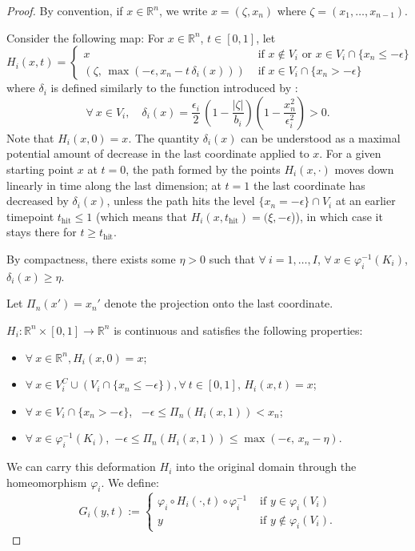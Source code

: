 \documentclass[11pt]{article}
\newcommand{\R}{\mathbb{R}}
\newcommand{\eps}{\epsilon}
\newcommand{\inter}{\cap}
\newcommand{\union}{\cup}
\theoremstyle{plain}
\theoremstyle{definition}
\theoremstyle{remark}
\begin{document}
\begin{proof}
	
	By convention, if $x \in \R^n$, we write $x = (\zeta, x_n)$ where $\zeta = (x_1,\ldots,x_{n-1})$.
	
	Consider the following map: For $x \in \R^n$, $t \in [0,1]$, let
	\[ H_i(x,t) =
	\begin{cases}
		x & \text{ if } x \notin V_i \text{ or } x \in V_i \inter \{x_n \leq - \eps\} \\
		(\zeta,\, \max(-\eps, x_n - t \, \delta_i(x) )) & \text{ if } x \in V_i \inter \{x_n > - \eps\}
	\end{cases}
	\]
	where $\delta_i$ is defined similarly to the function introduced by \cite{cantwell_topological_1968}:
	\[\forall\ x \in V_i, \quad \delta_i(x) = \frac{\eps_i}{2} \, \left(1 - \frac{|\zeta|}{b_i} \right) \left(1 - \frac{x_n^2}{\eps_i^2} \right) > 0 .\]
    Note that $H_i(x,0) = x$. The quantity $\delta_i(x)$ can be understood as a maximal potential amount of decrease in the last coordinate applied to $x$. 
    For a given starting point $x$ at $t = 0$, the path formed by the points $H_i(x, \cdot)$ moves down linearly in time along the last dimension; at $t = 1$ the last coordinate has decreased by $\delta_i(x)$, unless the path hits the level $\{x_n = -\eps\} \inter V_i$ at an earlier timepoint $t_{\mathrm{hit}} \leq 1$ (which means that $H_i(x,t_\mathrm{hit}) = (\xi, -\eps$)), in which case it stays there for $t \geq t_{\mathrm{hit}}$.
	
	By compactness, there exists some $\eta > 0$ such that $\forall\ i = 1, \ldots, I$, $\forall\ x \in \varphi_i^{-1}(K_i)$, $\delta_i(x) \geq \eta$.
	
	Let $\Pi_n(x') = x_n'$ denote the projection onto the last coordinate.
	
	$H_i : \R^n \times [0,1] \to \R^n$ is continuous and satisfies the following properties:
	
	\begin{itemize}
		\item $\forall\ x \in \R^n, H_i(x,0) = x$;
		\item $\forall\ x \in V_i^C \union (V_i \inter \{x_n \leq - \eps\}), \forall\ t \in [0,1],\, H_i(x,t) = x$;
		\item $\forall\ x \in V_i \inter \{x_n > - \eps\}$, \,
		$ -\eps \leq \Pi_n ( H_i(x,1) ) < x_n$;
		\item $\forall\ x \in \varphi_i^{-1}(K_i)$,\,
		$ -\eps \leq \Pi_n ( H_i(x,1) ) \leq \max(-\eps,\, x_n - \eta).$
	\end{itemize}
	
	We can carry this deformation $H_i$ into the original domain through the homeomorphism $\varphi_i$. We define:
	\[G_i(y,t) :=
	\begin{cases}
		\varphi_i \circ H_i(\cdot, t) \circ \varphi_i^{-1} &\text{ if } y \in \varphi_i(V_i) \\
		y &\text{ if } y \notin \varphi_i(V_i).
	\end{cases}
	\]
	

\end{proof}
\end{document}
